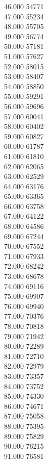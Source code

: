 { 46.000	54771 \\
 47.000	55234 \\
 48.000	55705 \\
 49.000	56774 \\
 50.000	57181 \\
 51.000	57627 \\
 52.000	58015 \\
 53.000	58407 \\
 54.000	58850 \\
 55.000	59291 \\
 56.000	59696 \\
 57.000	60041 \\
 58.000	60402 \\
 59.000	60827 \\
 60.000	61787 \\
 61.000	61810 \\
 62.000	62065 \\
 63.000	62529 \\
 64.000	63176 \\
 65.000	63365 \\
 66.000	63758 \\
 67.000	64122 \\
 68.000	64586 \\
 69.000	67244 \\
 70.000	67552 \\
 71.000	67933 \\
 72.000	68242 \\
 73.000	68678 \\
 74.000	69116 \\
 75.000	69907 \\
 76.000	69940 \\
 77.000	70376 \\
 78.000	70818 \\
 79.000	71942 \\
 80.000	72289 \\
 81.000	72710 \\
 82.000	72979 \\
 83.000	73357 \\
 84.000	73752 \\
 85.000	74330 \\
 86.000	74671 \\
 87.000	75058 \\
 88.000	75395 \\
 89.000	75829 \\
 90.000	76215 \\
 91.000	76581 \\
}
